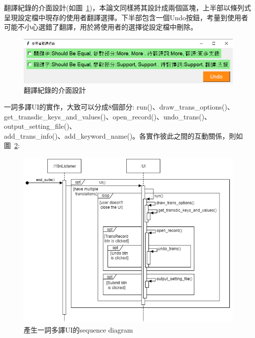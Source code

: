翻譯紀錄的介面設計(如圖~\ref{翻譯紀錄的介面設計})，本論文同樣將其設計成兩個區塊，上半部以條列式呈現設定檔中現存的使用者翻譯選擇。下半部包含一個Undo按鈕，考量到使用者可能不小心選錯了翻譯，用於將使用者的選擇從設定檔中刪除。
\begin{figure}[H]
    \centering
    \includegraphics[width= .9\textwidth]{../論文截圖/3-4-2 翻譯紀錄介面設計.png}
    \caption{翻譯紀錄的介面設計}
    \label{翻譯紀錄的介面設計}
\end{figure}

一詞多譯UI的實作，大致可以分成8個部分: run()、draw\_trans\_options()、get\_transdic\_keys\_and\_values()、open\_record()、undo\_trans()、output\_setting\_file()、\\add\_trans\_info()、add\_keyword\_name()。各實作彼此之間的互動關係，則如圖~\ref{產生一詞多譯UI的sequence diagram}:
\hspace*{\fill} \\

\begin{figure}[H]
    \centering
    \includegraphics[width= \textwidth]{../UML/i18n sequence diagram-一詞多譯UI.png}
    \caption{產生一詞多譯UI的sequence diagram}
    \label{產生一詞多譯UI的sequence diagram}
\end{figure}

